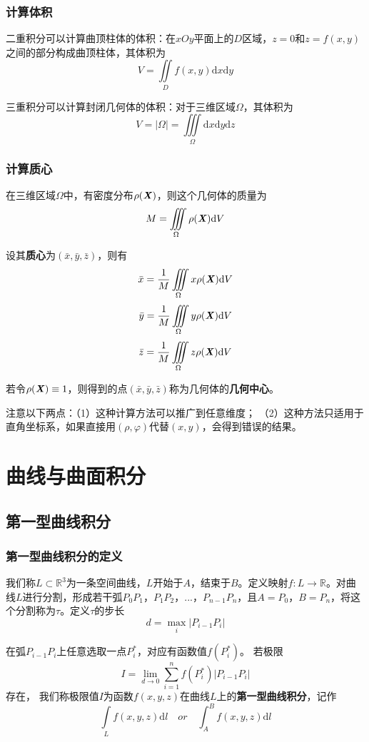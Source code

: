 \documentclass[UTF8,openany]{book}
\begin{document}
	\subsection{计算体积}
	二重积分可以计算曲顶柱体的体积：在$xOy$平面上的$D$区域，$z=0$和$z=f(x,y)$之间的部分构成曲顶柱体，其体积为
	$$V=\iint\limits_{D}f(x,y)\mathrm{d}x\mathrm{d}y$$
	\par 三重积分可以计算封闭几何体的体积：对于三维区域$\Omega$，其体积为
	$$V=|\Omega|=\iiint\limits_{\Omega}\mathrm{d}x\mathrm{d}y\mathrm{d}z$$
	\subsection{计算质心}
	在三维区域$\Omega$中，有密度分布$\rho(\textbf{\textit{X}})$，则这个几何体的质量为
	$$M=\iiint\limits_{\Omega}\rho(\textbf{\textit{X}})\mathrm{d}V$$
	\par 设其\textbf{质心}为$(\bar{x},\bar{y},\bar{z})$，则有
	$$\bar{x}=\frac{1}{M}\iiint\limits_{\Omega}x\rho(\textbf{\textit{X}})\mathrm{d}V$$
	$$\bar{y}=\frac{1}{M}\iiint\limits_{\Omega}y\rho(\textbf{\textit{X}})\mathrm{d}V$$
	$$\bar{z}=\frac{1}{M}\iiint\limits_{\Omega}z\rho(\textbf{\textit{X}})\mathrm{d}V$$
	\par 若令$\rho(\textbf{\textit{X}})\equiv1$，则得到的点$(\bar{x},\bar{y},\bar{z})$称为几何体的\textbf{几何中心}。
	\par 注意以下两点：（1）这种计算方法可以推广到任意维度；
	（2）这种方法只适用于直角坐标系，如果直接用$(\rho,\varphi)$代替$(x,y)$，会得到错误的结果。
	\chapter{曲线与曲面积分}
	\section{第一型曲线积分}
	\subsection{第一型曲线积分的定义}
	我们称$L\subset\mathbb{R}^{3}$为一条空间曲线，$L$开始于$A$，结束于$B$。定义映射$f:L\rightarrow\mathbb{R}$。对曲线$L$进行分割，形成若干弧$P_0P_1$，$P_1P_2$，...，$P_{n-1}P_{n}$，且$A=P_0$，$B=P_n$，将这个分割称为$\tau$。定义$\tau$的步长$$d=\max_i|P_{i-1}P_i|$$\par
	在弧$P_{i-1}P_{i}$上任意选取一点$P_{i}^*$，对应有函数值$f(P_i^*)$。
	若极限
	$$I=\lim_{d\rightarrow 0}\sum_{i=1}^{n}f(P_i^*)|P_{i-1}P_{i}|$$存在，
	我们称极限值$I$为函数$f(x,y,z)$在曲线$L$上的\textbf{第一型曲线积分}，记作
	$$\int\limits_L f(x,y,z)\mathrm{d}l\quad or\quad\int_{A}^{B}f(x,y,z)\mathrm{d}l$$
\end{document}
